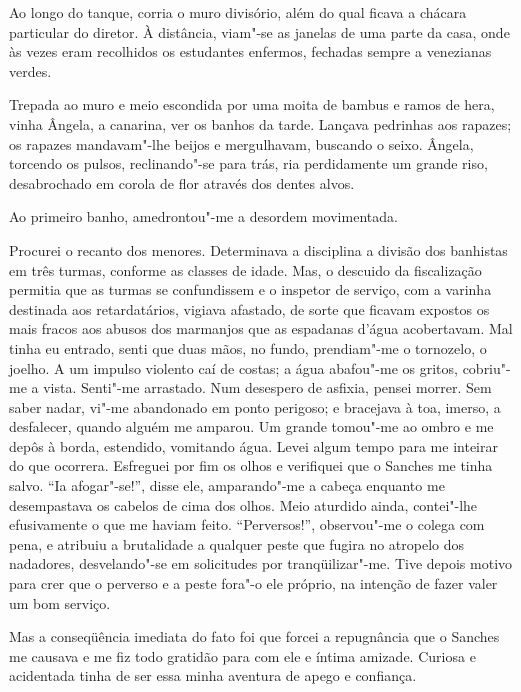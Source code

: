 Ao longo do tanque, corria o muro divisório, além do
qual ficava a chácara particular do diretor. À distância, viam"-se as
janelas de uma parte da casa, onde às vezes eram recolhidos os
estudantes enfermos, fechadas sempre a venezianas verdes. 

Trepada ao muro e meio escondida por uma moita de bambus e ramos de hera, 
vinha Ângela, a canarina, ver os banhos da tarde. Lançava pedrinhas aos
rapazes; os rapazes mandavam"-lhe beijos e mergulhavam, buscando o
seixo. Ângela, torcendo os pulsos, reclinando"-se para trás, ria
perdidamente um grande riso, desabrochado em corola de flor através dos
dentes alvos. 

Ao primeiro banho, amedrontou"-me a desordem movimentada. 

Procurei o recanto dos menores. Determinava a disciplina a
divisão dos banhistas em três turmas, conforme as classes de idade.
Mas, o descuido da fiscalização permitia que as turmas se confundissem
e o inspetor de serviço, com a varinha destinada aos retardatários,
vigiava afastado, de sorte que ficavam expostos os mais fracos aos
abusos dos marmanjos que as espadanas d'água acobertavam. Mal tinha eu
entrado, senti que duas mãos, no fundo, prendiam"-me o tornozelo, o
joelho. A um impulso violento caí de costas; a água abafou"-me os
gritos, cobriu"-me a vista. Senti"-me arrastado. Num desespero de
asfixia, pensei morrer. Sem saber nadar, vi"-me abandonado em ponto
perigoso; e bracejava à toa, imerso, a desfalecer, quando alguém me
amparou. Um grande tomou"-me ao ombro e me depôs à borda, estendido,
vomitando água. Levei algum tempo para me inteirar do que ocorrera.
Esfreguei por fim os olhos e verifiquei que o Sanches me tinha salvo.
``Ia afogar"-se!'', disse ele, amparando"-me a cabeça enquanto me
desempastava os cabelos de cima dos olhos. Meio aturdido ainda,
contei"-lhe efusivamente o que me haviam feito. ``Perversos!'', 
observou"-me o colega com pena, e atribuiu a brutalidade a qualquer
peste que fugira no atropelo dos nadadores, desvelando"-se em
solicitudes por tranqüilizar"-me. Tive depois motivo para crer que o
perverso e a peste fora"-o ele próprio, na intenção de fazer valer um
bom serviço. 

Mas a conseqüência imediata do fato foi que forcei a
repugnância que o Sanches me causava e me fiz todo gratidão para com
ele e íntima amizade. Curiosa e acidentada tinha de ser essa minha
aventura de apego e confiança. 

